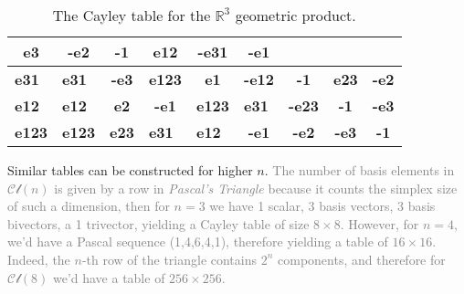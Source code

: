 \documentclass[a4paper]{book}
\numberwithin{equation}{chapter}
\begin{document}
\begin{table}[h]
\begin{tabular}{|c|c|c|c|c|l|l|l|l|}
  \cellcolor[HTML]{E1C4CF}\textbf{e3} &
  \cellcolor[HTML]{E7D3C3}\textbf{-e2} &
  \multicolumn{1}{c|}{\cellcolor[HTML]{F4F0AB}\textbf{-1}} &
  \cellcolor[HTML]{CE99F3}\textbf{e12} &
  \cellcolor[HTML]{D5A7E7}\textbf{-e31} &
  \multicolumn{1}{c|}{\cellcolor[HTML]{EDE2B7}\textbf{-e1}} \\ \hline
\multicolumn{1}{|l|}{\cellcolor[HTML]{D5A7E7}\textbf{e31}} &
  \multicolumn{1}{l|}{\cellcolor[HTML]{D5A7E7}\textbf{e31}} &
  \cellcolor[HTML]{E1C4CF}\textbf{-e3} &
  \multicolumn{1}{l|}{\cellcolor[HTML]{998AFF}\textbf{e123}} &
  \cellcolor[HTML]{EDE2B7}\textbf{e1} &
  \cellcolor[HTML]{CE99F3}\textbf{-e12} &
  \multicolumn{1}{c|}{\cellcolor[HTML]{F4F0AB}\textbf{-1}} &
  \cellcolor[HTML]{DBB6DB}\textbf{e23} &
  \multicolumn{1}{c|}{\cellcolor[HTML]{E7D3C3}\textbf{-e2}} \\ \hline
\multicolumn{1}{|l|}{\cellcolor[HTML]{CE99F3}\textbf{e12}} &
  \multicolumn{1}{l|}{\cellcolor[HTML]{CE99F3}\textbf{e12}} &
  \cellcolor[HTML]{E7D3C3}\textbf{e2} &
  \cellcolor[HTML]{EDE2B7}\textbf{-e1} &
  \multicolumn{1}{l|}{\cellcolor[HTML]{998AFF}\textbf{e123}} &
  \cellcolor[HTML]{D5A7E7}\textbf{e31} &
  \cellcolor[HTML]{DBB6DB}\textbf{-e23} &
  \multicolumn{1}{c|}{\cellcolor[HTML]{F4F0AB}\textbf{-1}} &
  \multicolumn{1}{c|}{\cellcolor[HTML]{E1C4CF}\textbf{-e3}} \\ \hline
\multicolumn{1}{|l|}{\cellcolor[HTML]{998AFF}\textbf{e123}} &
  \multicolumn{1}{l|}{\cellcolor[HTML]{998AFF}\textbf{e123}} &
  \multicolumn{1}{l|}{\cellcolor[HTML]{DBB6DB}\textbf{e23}} &
  \multicolumn{1}{l|}{\cellcolor[HTML]{D5A7E7}\textbf{e31}} &
  \multicolumn{1}{l|}{\cellcolor[HTML]{CE99F3}\textbf{e12}} &
  \multicolumn{1}{c|}{\cellcolor[HTML]{EDE2B7}\textbf{-e1}} &
  \multicolumn{1}{c|}{\cellcolor[HTML]{E7D3C3}\textbf{-e2}} &
  \multicolumn{1}{c|}{\cellcolor[HTML]{E1C4CF}\textbf{-e3}} &
  \multicolumn{1}{c|}{\cellcolor[HTML]{F4F0AB}\textbf{-1}} \\ \hline
\end{tabular}
\caption{The Cayley table for the $\mathbb{R}^3$ geometric product.}
\label{tab:my-table}
\end{table}

Similar tables can be constructed for higher $n$. \textcolor{gray}{The number of basis elements in
$\mathcal{Cl}(n)$ is given by a row in \emph{Pascal's Triangle} because it counts the simplex size of
such a dimension, then for $n=3$ we have 1 scalar, 3 basis vectors,
3 basis bivectors, a 1 trivector, yielding a Cayley table of size $8\times 8$. However, for $n=4$, we'd have
a Pascal sequence (1,4,6,4,1), therefore yielding a table of $16\times16$. Indeed, the $n$-th row of the triangle
contains $2^n$ components, and therefore for $\mathcal{Cl}(8)$ we'd have a table of $256\times 256$.}
\end{document}
